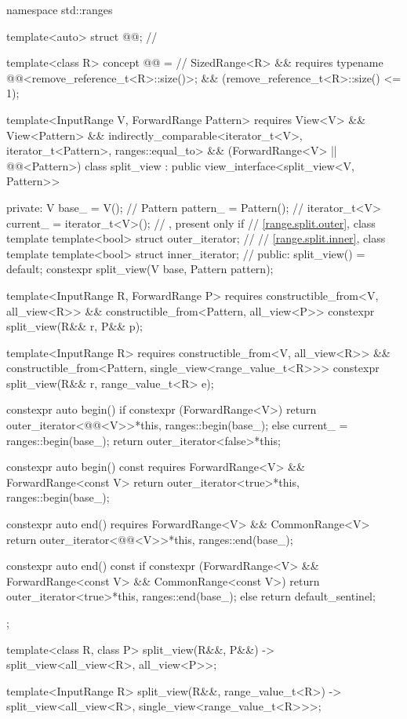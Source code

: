 \begin{codeblock}
namespace std::ranges {
  template<auto> struct @@;       // \expos

  template<class R>
  concept @@ =                          // \expos
    SizedRange<R> &&
    requires { typename @@<remove_reference_t<R>::size()>; } &&
    (remove_reference_t<R>::size() <= 1);

  template<InputRange V, ForwardRange Pattern>
    requires View<V> && View<Pattern> &&
             indirectly_comparable<iterator_t<V>, iterator_t<Pattern>, ranges::equal_to> &&
             (ForwardRange<V> || @@<Pattern>)
  class split_view : public view_interface<split_view<V, Pattern>> {
  private:
    V base_ = V();                              // \expos
    Pattern pattern_ = Pattern();               // \expos
    iterator_t<V> current_ = iterator_t<V>();   // \expos, present only if 
    // \ref{range.split.outer}, class template 
    template<bool> struct outer_iterator;       // \expos
    // \ref{range.split.inner}, class template 
    template<bool> struct inner_iterator;       // \expos
  public:
    split_view() = default;
    constexpr split_view(V base, Pattern pattern);

    template<InputRange R, ForwardRange P>
      requires constructible_from<V, all_view<R>> &&
               constructible_from<Pattern, all_view<P>>
    constexpr split_view(R&& r, P&& p);

    template<InputRange R>
      requires constructible_from<V, all_view<R>> &&
               constructible_from<Pattern, single_view<range_value_t<R>>>
    constexpr split_view(R&& r, range_value_t<R> e);

    constexpr auto begin() {
      if constexpr (ForwardRange<V>)
        return outer_iterator<@@<V>>{*this, ranges::begin(base_)};
      else {
        current_ = ranges::begin(base_);
        return outer_iterator<false>{*this};
      }
    }

    constexpr auto begin() const requires ForwardRange<V> && ForwardRange<const V> {
      return outer_iterator<true>{*this, ranges::begin(base_)};
    }

    constexpr auto end() requires ForwardRange<V> && CommonRange<V> {
      return outer_iterator<@@<V>>{*this, ranges::end(base_)};
    }

    constexpr auto end() const {
      if constexpr (ForwardRange<V> && ForwardRange<const V> && CommonRange<const V>)
        return outer_iterator<true>{*this, ranges::end(base_)};
      else
        return default_sentinel;
    }
  };

  template<class R, class P>
    split_view(R&&, P&&) -> split_view<all_view<R>, all_view<P>>;

  template<InputRange R>
    split_view(R&&, range_value_t<R>)
      -> split_view<all_view<R>, single_view<range_value_t<R>>>;
}
\end{codeblock}

